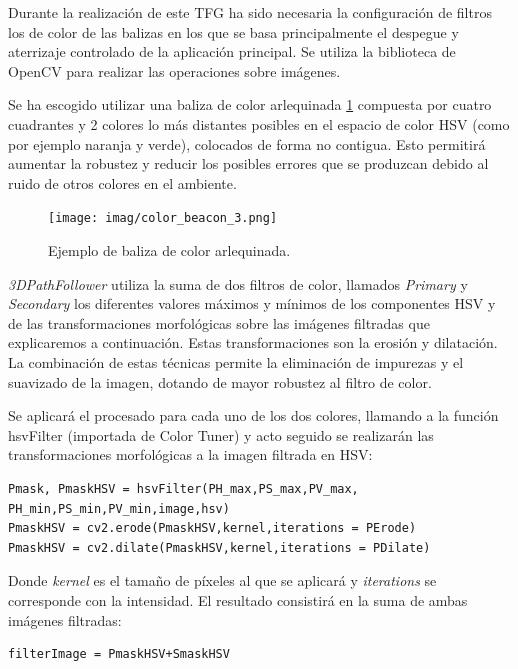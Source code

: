 Durante la realización de este TFG ha sido necesaria la configuración de filtros los de color de las balizas en los que se basa principalmente el despegue y aterrizaje controlado de la aplicación principal. Se utiliza la biblioteca de OpenCV para realizar las operaciones sobre imágenes.

Se ha escogido utilizar una baliza de color arlequinada \ref{fig:baliza arlequinada} compuesta por cuatro cuadrantes y 2 colores lo más distantes posibles en el espacio de color HSV (como por ejemplo naranja y verde), colocados de forma no contigua. Esto permitirá aumentar la robustez y reducir los posibles errores que se produzcan debido al ruido de otros colores en el ambiente.

\begin{figure}[H]
	\begin{center}	
		\texttt{[image: imag/color\_beacon\_3.png]}
		\caption{Ejemplo de baliza de color arlequinada.}
		\label{fig:baliza arlequinada}
	\end{center}
\end{figure}

\textit{3DPathFollower} utiliza la suma de dos filtros de color, llamados \textit{Primary} y \textit{Secondary} los diferentes valores máximos y mínimos de los componentes HSV y de las transformaciones morfológicas sobre las imágenes filtradas que explicaremos a continuación. Estas transformaciones  son la erosión y dilatación. La combinación de estas técnicas permite la eliminación de impurezas y el suavizado de la imagen, dotando de mayor robustez al filtro de color.

Se aplicará el procesado para cada uno de los dos colores, llamando a la función hsvFilter (importada de Color Tuner) y acto seguido se realizarán las transformaciones morfológicas a la imagen filtrada en HSV:

\begin{lstlisting}[backgroundcolor=\color{gray!15}]
Pmask, PmaskHSV = hsvFilter(PH_max,PS_max,PV_max,
PH_min,PS_min,PV_min,image,hsv)
PmaskHSV = cv2.erode(PmaskHSV,kernel,iterations = PErode)
PmaskHSV = cv2.dilate(PmaskHSV,kernel,iterations = PDilate)
\end{lstlisting}

Donde \textit{kernel} es el tamaño de píxeles al que se aplicará y \textit{iterations} se corresponde con la intensidad.
El resultado consistirá en la suma de ambas imágenes filtradas:
\begin{lstlisting}[backgroundcolor=\color{gray!15}]
filterImage = PmaskHSV+SmaskHSV
\end{lstlisting}

